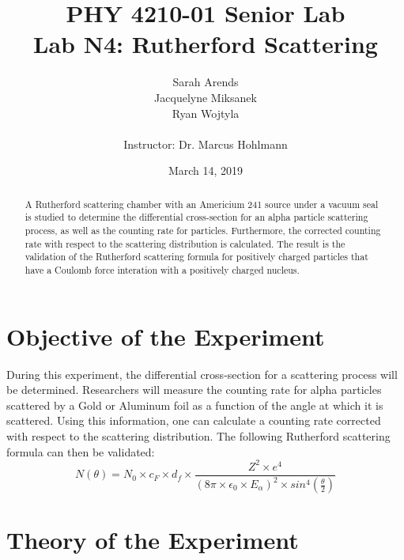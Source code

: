 \documentclass[a4paper]{article}
\title{PHY 4210-01 Senior Lab \\Lab N4: Rutherford Scattering}
\author{Sarah Arends \\
        Jacquelyne Miksanek \\
        Ryan Wojtyla \\ \\
        Instructor: Dr. Marcus Hohlmann}
\date{March 14, 2019}
\begin{document}
\maketitle

\begin{abstract}
\qq A Rutherford scattering chamber with an Americium 241 source under
a vacuum seal is studied to determine the differential cross-section
for an alpha particle scattering process, as well as the counting rate
for particles. Furthermore, the corrected counting rate with respect
to the scattering distribution is calculated. The result is the
validation of the Rutherford scattering formula for positively charged
particles that have a Coulomb force interation with a positively
charged nucleus.
\end{abstract}

\newpage

\tableofcontents

\newpage

\section{Objective of the Experiment}
\qq During this experiment, the differential cross-section for a scattering
process will be determined. Researchers will measure the counting rate for alpha
particles scattered by a Gold or Aluminum foil as a function of the angle at
which it is scattered. Using this information, one can calculate a counting rate
corrected with respect to the scattering distribution. The following Rutherford
scattering formula can then be validated:
\begin{equation}
N(\theta) = N_0 \times c_F \times d_f \times
            \frac {Z^2 \times e^4}
                  {
                  \left( 8\pi \times \epsilon_0\times E_{\alpha} \right) ^2
                   \times  sin^4 \left( \frac{\theta}{2} \right)
                  }
\end{equation}

\section{Theory of the Experiment}
\end{document}
